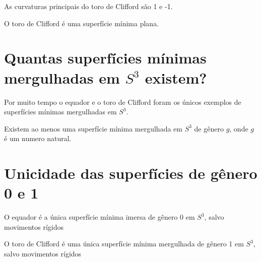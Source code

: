 \begin{proposicao}
	As curvaturas principais do toro de Clifford são 1 e -1.
\end{proposicao}

\begin{proposicao}
	O toro de Clifford é uma superfície mínima plana.
\end{proposicao}

\section{Quantas superfícies mínimas mergulhadas em $S^3$ existem?}

\begin{observacao}
	Por muito tempo o equador e o toro de Clifford foram os únicos exemplos de superfícies mínimas mergulhadas em $S^3$.
\end{observacao}

\begin{teorema}[Lawson]
	Existem ao menos uma superfície mínima mergulhada em $S^3$ de gênero $g$, onde $g$ é um numero natural.
\end{teorema}


\section{Unicidade das superfícies de gênero 0 e 1}

\begin{teorema}[Almgren]
	O equador é a única superfície mínima imersa de gênero 0 em $S^3$, salvo movimentos rígidos
\end{teorema}

\begin{observacao}
	O toro de Clifford é uma única superfície mínima mergulhada de gênero 1 em $S^3$, salvo movimentos rígidos
\end{observacao}